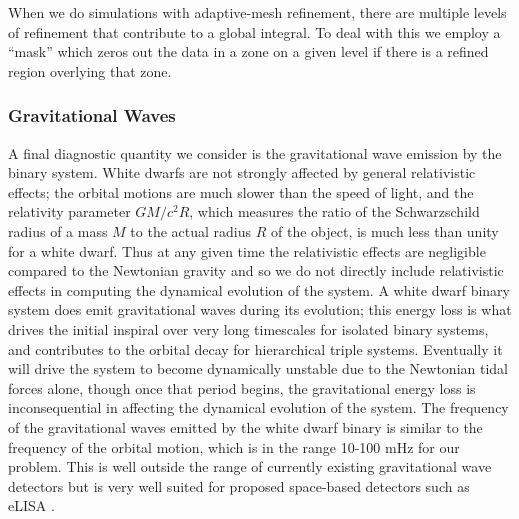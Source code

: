 \documentclass[12pt]{article}
\begin{document}
When we do simulations with adaptive-mesh refinement, there are multiple levels of refinement
that contribute to a global integral. To deal with this we employ a ``mask'' which zeros out
the data in a zone on a given level if there is a refined region overlying that zone.



\subsubsection{Gravitational Waves}
\label{sec:gravitational_waves}

A final diagnostic quantity we consider is the gravitational wave emission by the
binary system. White dwarfs are not strongly affected by general relativistic effects;
the orbital motions are much slower than the speed of light, and the relativity parameter
$GM / c^2 R$, which measures the ratio of the Schwarzschild radius of a mass $M$ to the actual
radius $R$ of the object, is much less than unity for a white dwarf. Thus at any given time the
relativistic effects are negligible compared to the Newtonian gravity and so we do not
directly include relativistic effects in computing the dynamical evolution of the system.
A white dwarf binary system does emit gravitational waves during its evolution; this energy loss
is what drives the initial inspiral over very long timescales for isolated binary systems, and
contributes to the orbital decay for hierarchical triple systems. Eventually it will drive the system
to become dynamically unstable due to the Newtonian tidal forces alone, though once that period begins,
the gravitational energy loss is inconsequential in affecting the dynamical evolution of the system.
The frequency of the gravitational waves emitted by the white dwarf binary
is similar to the frequency of the orbital motion, which is in the range
10-100 mHz for our problem. This is well outside the range of currently existing
gravitational wave detectors but is very well suited for proposed space-based detectors such as eLISA \citep{eLISA}.
\end{document}
